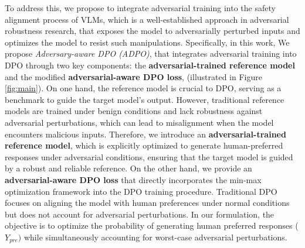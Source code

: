 To address this, we propose to integrate adversarial training into the safety alignment process of VLMs, which is a well-established approach in adversarial robustness research\citep{goodfellow2014explaining}, that exposes the model to adversarially perturbed inputs and optimizes the model to resist such manipulations. Specifically, in this work, We propose \textit{Adversary-aware DPO (ADPO)}, that integrates adversarial training into DPO through two key components: the \textbf{adversarial-trained reference model} and the modified \textbf{adversarial-aware DPO loss}, (illustrated in Figure \ref{fig:main}). On one hand, the reference model is crucial to DPO, serving as a benchmark to guide the target model's output. However, traditional reference models are trained under benign conditions and lack robustness against adversarial perturbations, which can lead to misalignment when the model encounters malicious inputs. Therefore, we introduce an \textbf{adversarial-trained reference model}, which is explicitly optimized to generate human-preferred responses under adversarial conditions, ensuring that the target model is guided by a robust and reliable reference. On the other hand, we provide an  \textbf{adversarial-aware DPO loss} that directly incorporates the min-max optimization framework into the DPO training procedure. Traditional DPO focuses on aligning the model with human preferences under normal conditions but does not account for adversarial perturbations. In our formulation, the objective is to optimize the probability of generating human preferred responses ($Y_{pre})$ while simultaneously accounting for worst-case adversarial perturbations. 



